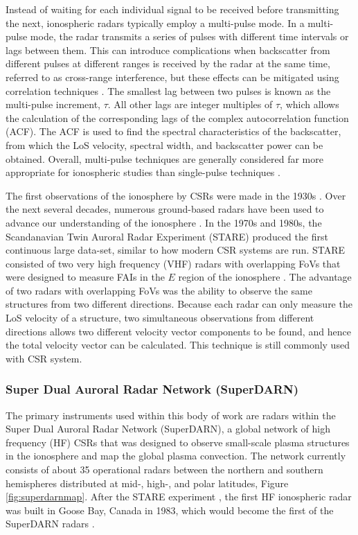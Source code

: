 Instead of waiting for each individual signal to be received before transmitting the next, ionospheric radars typically employ a multi-pulse mode. In a multi-pulse mode, the radar transmits a series of pulses with different time intervals or lags between them.  This can introduce complications when backscatter from different pulses at different ranges is received by the radar at the same time, referred to as cross-range interference, but these effects can be mitigated using correlation techniques \citep{Farley1972}.  The smallest lag between two pulses is known as the multi-pulse increment, \(\tau\).  All other lags are integer multiples of \(\tau\), which allows the calculation of the corresponding lags of the complex autocorrelation function (ACF).  The ACF is used to find the spectral characteristics of the backscatter, from which the LoS velocity, spectral width, and backscatter power can be obtained.  Overall, multi-pulse techniques are generally considered far more appropriate for ionospheric studies than single-pulse techniques \citep{Farley1972,Greenwald1983,Greenwald1985,Barthes1998,Ponomarenko2006}.

The first observations of the ionosphere by CSRs were made in the 1930s \citep{Eckersley1937,Harang1938}.  Over the next several decades, numerous ground-based radars have been used to advance our understanding of the ionosphere  \citep{Hultqvist1964,Leadabrand1965,Unwin1972,Sahr1996}.  In the 1970s and 1980s, the Scandanavian Twin Auroral Radar Experiment (STARE) produced the first continuous large data-set, similar to how modern CSR systems are run.  STARE consisted of two very high frequency (VHF) radars with overlapping FoVs that were designed to measure FAIs in the \(E\) region of the ionosphere \citep{Greenwald1997}.  The advantage of two radars with overlapping FoVs was the ability to observe the same structures from two different directions.  Because each radar can only measure the LoS velocity of a structure, two simultaneous observations from different directions allows two different velocity vector components to be found, and hence the total velocity vector can be calculated.  This technique is still commonly used with CSR system.

\subsubsection{Super Dual Auroral Radar Network (SuperDARN)}
\label{sec:superdarn}
The primary instruments used within this body of work are radars within the Super Dual Auroral Radar Network (SuperDARN), a global network of high frequency (HF) CSRs that was designed to observe small-scale plasma structures in the ionosphere and map the global plasma convection.  The network currently consists of about 35 operational radars between the northern and southern hemispheres distributed at mid-, high-, and polar latitudes, Figure \ref{fig:superdarnmap}.  After the STARE experiment \citep{Greenwald1978}, the first HF ionospheric radar was built in Goose Bay, Canada in 1983, which would become the first of the SuperDARN radars \citep{Greenwald1985}.  

